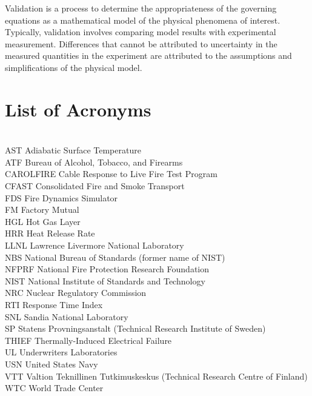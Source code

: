 \documentclass[11pt]{book}
\begin{document}
Validation is a process to determine the appropriateness of the governing equations as a mathematical model of the physical phenomena of interest. Typically, validation involves comparing model results with experimental measurement. Differences that cannot be attributed to uncertainty in the measured quantities in the experiment are attributed to the assumptions and simplifications of the physical model.

\cleardoublepage
{}
{}
\tableofcontents

\cleardoublepage
{}
{}
\listoffigures

\cleardoublepage
{}
{}
\listoftables

\chapter{List of Acronyms}

\begin{tabbing}
\hspace{1.5in} \= \\
AST \> Adiabatic Surface Temperature \\
ATF \> Bureau of Alcohol, Tobacco, and Firearms \\
CAROLFIRE \> Cable Response to Live Fire Test Program \\
CFAST \> Consolidated Fire and Smoke Transport \\
FDS \> Fire Dynamics Simulator \\
FM \> Factory Mutual \\
HGL \> Hot Gas Layer \\
HRR \> Heat Release Rate \\
LLNL \> Lawrence Livermore National Laboratory \\
NBS \> National Bureau of Standards (former name of NIST) \\
NFPRF \> National Fire Protection Research Foundation \\
NIST \> National Institute of Standards and Technology \\
NRC \> Nuclear Regulatory Commission \\
RTI \> Response Time Index \\
SNL \> Sandia National Laboratory \\
SP \>  Statens Provningsanstalt (Technical Research Institute of Sweden) \\
THIEF \> Thermally-Induced Electrical Failure \\
UL  \> Underwriters Laboratories \\
USN \> United States Navy \\
VTT \> Valtion Teknillinen Tutkimuskeskus (Technical Research Centre of Finland) \\
WTC \> World Trade Center \\
\end{tabbing}
\end{document}

